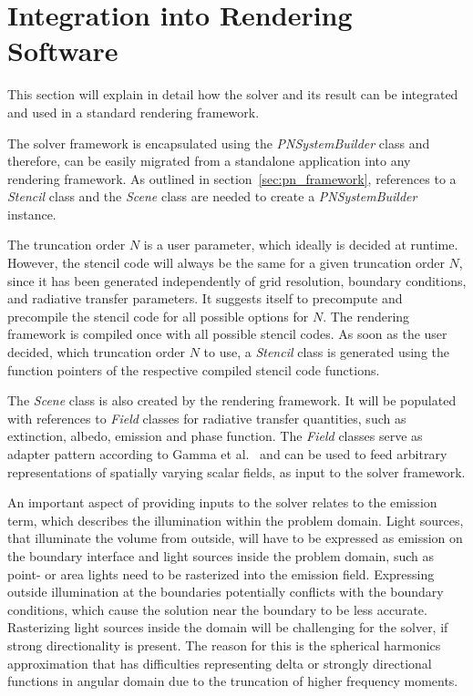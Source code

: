 \section{Integration into Rendering Software}
\label{sec:pn_rendering_integration}

This section will explain in detail how the solver and its result can be integrated and used in a standard rendering framework.

The solver framework is encapsulated using the \emph{PNSystemBuilder} class and therefore, can be easily migrated from a standalone application into any rendering framework. As outlined in section~\ref{sec:pn_framework}, references to a \emph{Stencil} class and the \emph{Scene} class are needed to create a \emph{PNSystemBuilder} instance.

The truncation order $N$ is a user parameter, which ideally is decided at runtime. However, the stencil code will always be the same for a given truncation order $N$, since it has been generated independently of grid resolution, boundary conditions, and radiative transfer parameters. It suggests itself to precompute and precompile the stencil code for all possible options for $N$. The rendering framework is compiled once with all possible stencil codes. As soon as the user decided, which truncation order $N$ to use, a \emph{Stencil} class is generated using the function pointers of the respective compiled stencil code functions.

The \emph{Scene} class is also created by the rendering framework. It will be populated with references to \emph{Field} classes for radiative transfer quantities, such as extinction, albedo, emission and phase function. The \emph{Field} classes serve as adapter pattern according to Gamma et al.~\cite{Gamma95} and can be used to feed arbitrary representations of spatially varying scalar fields, as input to the solver framework.

An important aspect of providing inputs to the solver relates to the emission term, which describes the illumination within the problem domain. Light sources, that illuminate the volume from outside, will have to be expressed as emission on the boundary interface and light sources inside the problem domain, such as point- or area lights need to be rasterized into the emission field. Expressing outside illumination at the boundaries potentially conflicts with the boundary conditions, which cause the solution near the boundary to be less accurate. Rasterizing light sources inside the domain will be challenging for the solver, if strong directionality is present. The reason for this is the spherical harmonics approximation that has difficulties representing delta or strongly directional functions in angular domain due to the truncation of higher frequency moments.


